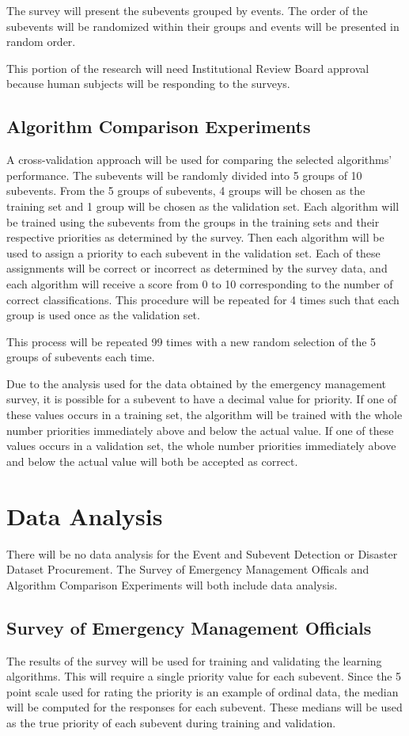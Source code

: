 \documentclass[conference]{IEEEtran}
\begin{document}
The survey will present the subevents grouped by events. The order of the subevents will be randomized within their groups and events will be presented in random order.

This portion of the research will need Institutional Review Board approval because human subjects will be responding to the surveys.
\subsection{Algorithm Comparison Experiments}
A cross-validation approach will be used for comparing the selected algorithms' performance. The subevents will be randomly divided into 5 groups of 10 subevents. From the 5 groups of subevents, 4 groups will be chosen as the training set and 1 group will be chosen as the validation set. Each algorithm will be trained using the subevents from the groups in the training sets and their respective priorities as determined by the survey. Then each algorithm will be used to assign a priority to each subevent in the validation set. Each of these assignments will be correct or incorrect as determined by the survey data, and each algorithm will receive a score from 0 to 10 corresponding to the number of correct classifications. This procedure will be repeated for 4 times such that each group is used once as the validation set.

This process will be repeated 99 times with a new random selection of the 5 groups of subevents each time.

Due to the analysis used for the data obtained by the emergency management survey, it is possible for a subevent to have a decimal value for priority. If one of these values occurs in a training set, the algorithm will be trained with the whole number priorities immediately above and below the actual value. If one of these values occurs in a validation set, the whole number priorities immediately above and below the actual value will both be accepted as correct.

\section{Data Analysis}
There will be no data analysis for the Event and Subevent Detection or Disaster Dataset Procurement. The Survey of Emergency Management Officals and Algorithm Comparison Experiments will both include data analysis.
\subsection{Survey of Emergency Management Officials}
The results of the survey will be used for training and validating the learning algorithms. This will require a single priority value for each subevent. Since the 5 point scale used for rating the priority is an example of ordinal data, the median will be computed for the responses for each subevent. These medians will be used as the true priority of each subevent during training and validation.
\end{document}

